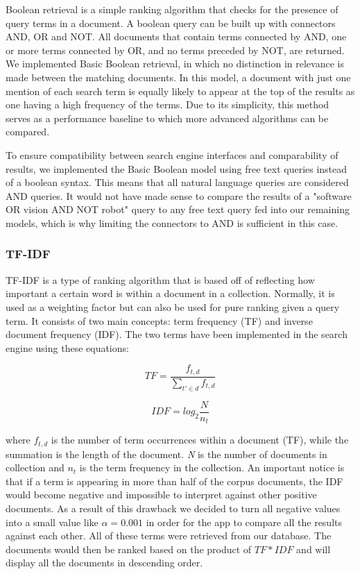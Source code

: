 Boolean retrieval is a simple ranking algorithm that checks for the presence of query terms in a document. A boolean query can be built up with connectors AND, OR and NOT. All documents that contain terms connected by AND, one or more terms connected by OR, and no terms preceded by NOT, are returned. We implemented Basic Boolean retrieval, in which no distinction in relevance is made between the matching documents. In this model, a document with just one mention of each search term is equally likely to appear at the top of the results as one having a high frequency of the terms. Due to its simplicity, this method serves as a performance baseline to which more advanced algorithms can be compared.

To ensure compatibility between search engine interfaces and comparability of results, we implemented the Basic Boolean model using free text queries instead of a boolean syntax. This means that all natural language queries are considered AND queries. It would not have made sense to compare the results of a "software OR vision AND NOT robot" query to any free text query fed into our remaining models, which is why limiting the connectors to AND is sufficient in this case.

\subsubsection{TF-IDF} %
\label{sub:tf_idf}

TF-IDF is a type of ranking algorithm that is based off of reflecting how important a certain word is within a document in a collection. Normally, it is used as a weighting factor but can also be used for pure ranking given a query term. It consists of two main concepts:  term frequency (TF) and inverse document frequency (IDF). The two terms have been implemented in the search engine using these equations:

$$TF = \frac{f_{t,d}}{\sum\limits_{t' \in d} f_{t,d}}$$

$$IDF = log_2 \frac{N}{n_t}$$

where $f_{t,d}$ is the number of term occurrences within a document (TF), while the summation is the length of the document. \emph{N} is the number of documents in collection and $n_t$ is the term frequency in the collection. An important notice is that if a term is appearing in more than half of the corpus documents, the IDF would become negative and impossible to interpret against other positive documents. As a result of this drawback we decided to turn all negative values into a small value like $\alpha = 0.001$ in order for the app to compare all the results against each other. All of these terms were retrieved from our database. The documents would then be ranked based on the product of $TF * IDF$ and will display all the documents in descending order. 

